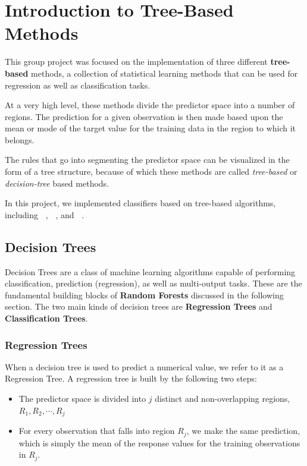\graphicspath{{images/}}

\section{Introduction to Tree-Based Methods}

This group project was focused on the implementation of three different \textbf{tree-based} methods, a collection of statistical learning methods that can be used for regression as well as classification tasks.

At a very high level, these methods divide the predictor space into a number of regions. The prediction for a given observation is then made based upon the mean or mode of the target value for the training data in the region to which it belongs.

The rules that go into segmenting the predictor space can be visualized in the form of a tree structure, because of which these methods are called \textit{tree-based} or \textit{decision-tree} based methods.

In this project, we implemented classifiers based on tree-based algorithms, including \textbf{~}, \textbf{~}, and \textbf{~}.

\subsection{Decision Trees} \label{sec:dt}

Decision Trees \cite{fernandez_decision_tree} are a class of machine learning algorithms capable of performing classification, prediction (regression), as well as multi-output tasks. These are the fundamental building blocks of \textbf{Random Forests} discussed in the following section. The two main kinds of decision trees are \textbf{Regression Trees} and \textbf{Classification Trees}.

\subsubsection{Regression Trees}

When a decision tree is used to predict a numerical value, we refer to it as a Regression Tree. A regression tree is built by the following two steps:

\begin{itemize}
    \item The predictor space is divided into $j$ distinct and non-overlapping regions, $R_{1}, R_{2}, \cdots,R_{j}$
    \item For every observation that falls into region $R_{j}$, we make the same prediction, which is simply the mean of the response values for the training observations in $R_{j}$.
\end{itemize}

